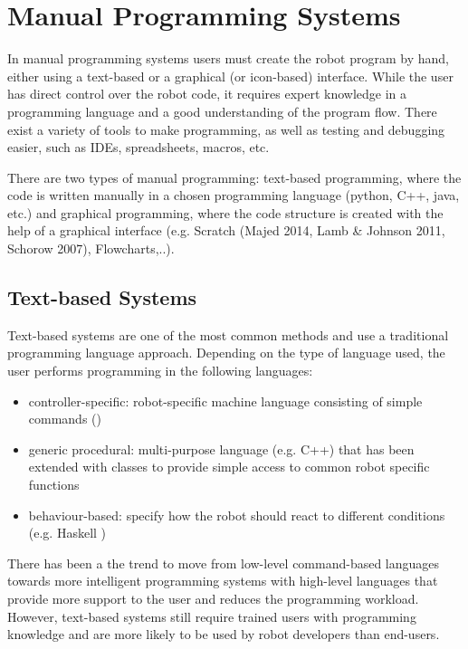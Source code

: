 \section{Manual Programming Systems}\label{subsec:Manual Programming Systems}
In manual programming systems users must create the robot program by hand, either using a text-based or a graphical (or icon-based) interface.
While the user has direct control over the robot code, it requires expert knowledge in a programming language and a good understanding of the program flow.
There exist a variety of tools to make programming, as well as testing and debugging easier, such as IDEs, spreadsheets, macros, etc.

There are two types of manual programming: text-based programming, where the code is written manually in a chosen programming language (python, C++, java, etc.) and graphical programming, where the code structure is created with the help of a graphical interface (e.g. Scratch (Majed 2014, Lamb \& Johnson 2011, Schorow 2007), Flowcharts,..). 

\subsection{Text-based Systems}\label{sssec:Text-based Systems}
Text-based systems are one of the most common methods and use a traditional programming language approach. 
Depending on the type of language used, the user performs programming in the following languages:
\begin{itemize}
	\item controller-specific: robot-specific machine language consisting of simple commands (\cite{KUKA,ABB})
	\item generic procedural: multi-purpose language (e.g. C++) that has been extended with classes to provide simple access to common robot specific functions \cite{Lego,etc.}
	\item behaviour-based: specify how the robot should react to different conditions (e.g. Haskell \cite{bibid})
\end{itemize}
There has been a the trend to move from low-level command-based languages towards more intelligent programming systems with high-level languages that provide more support to the user and  reduces the programming workload.
However, text-based systems still require trained users with programming knowledge and are more likely to be used by robot developers than end-users.



